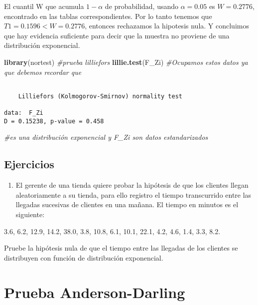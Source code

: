 \documentclass[
  a4paper,
  oneside,
  openany]{book}
\newenvironment{Shaded}{\begin{snugshade}}{\end{snugshade}}
\newcommand{\CommentTok}[1]{\textcolor[rgb]{0.56,0.35,0.01}{\textit{#1}}}
\newcommand{\FunctionTok}[1]{\textcolor[rgb]{0.13,0.29,0.53}{\textbf{#1}}}
\newcommand{\NormalTok}[1]{#1}
\providecommand{\tightlist}{%
  \setlength{\itemsep}{0pt}\setlength{\parskip}{0pt}}
\begin{document}
El cuantil W que acumula \(1-\alpha\) de probabilidad, usando \(\alpha=0.05\) es \(W = 0.2776\), encontrado en las tablas correspondientes. Por lo tanto tenemos que \(T1=0.1596 < W=0.2776\), entonces rechazamos la hipotesis nula. Y concluimos que hay evidencia suficiente para decir que la muestra no proviene de una distribución exponencial.

\begin{Shaded}
\begin{Highlighting}[]
\FunctionTok{library}\NormalTok{(nortest) }\CommentTok{\#prueba lilliefors}
\FunctionTok{lillie.test}\NormalTok{(F\_Zi) }\CommentTok{\#Ocupamos estos datos ya que debemos recordar que }
\end{Highlighting}
\end{Shaded}

\begin{verbatim}

    Lilliefors (Kolmogorov-Smirnov) normality test

data:  F_Zi
D = 0.15238, p-value = 0.458
\end{verbatim}

\begin{Shaded}
\begin{Highlighting}[]
                   \CommentTok{\#es una distribución exponencial y F\_Zi son datos estandarizados }
\end{Highlighting}
\end{Shaded}

\hypertarget{ejercicios-15}{%
\section{Ejercicios}\label{ejercicios-15}}

\begin{enumerate}
\def\labelenumi{\arabic{enumi}.}
\tightlist
\item
  El gerente de una tienda quiere probar la hipótesis de que los clientes llegan aleatoriamente a su tienda, para ello registro el tiempo transcurrido entre las llegadas sucesivas de clientes en una mañana. El tiempo en minutos es el siguiente:
\end{enumerate}

3.6, 6.2, 12.9, 14.2, 38.0, 3.8, 10.8, 6.1, 10.1, 22.1, 4.2, 4.6, 1.4, 3.3, 8.2.

Pruebe la hipótesis nula de que el tiempo entre las llegadas de los clientes se distribuyen con función de distribución exponencial.

\hypertarget{prueba-anderson-darling}{%
\chapter{Prueba Anderson-Darling}\label{prueba-anderson-darling}}
\end{document}
